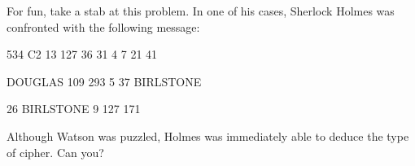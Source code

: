 \begin{problem}
For fun, take a stab at this problem.  In one of his cases, Sherlock Holmes was confronted with the following message:

\begin{center}
534 C2 13 127 36 31 4 7 21 41

DOUGLAS 109 293 5 37 BIRLSTONE

26 BIRLSTONE 9 127 171
\end{center}
Although Watson was puzzled, Holmes was immediately able to deduce the type of cipher.  Can you?
\end{problem}
